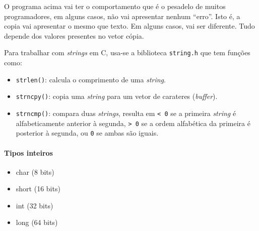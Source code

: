 \documentclass[
]{article}
\newenvironment{Shaded}{}{}
\newcommand{\CommentTok}[1]{\textcolor[rgb]{0.38,0.63,0.69}{\textit{#1}}}
\newcommand{\ControlFlowTok}[1]{\textcolor[rgb]{0.00,0.44,0.13}{\textbf{#1}}}
\newcommand{\DataTypeTok}[1]{\textcolor[rgb]{0.56,0.13,0.00}{#1}}
\newcommand{\DecValTok}[1]{\textcolor[rgb]{0.25,0.63,0.44}{#1}}
\newcommand{\ImportTok}[1]{#1}
\newcommand{\NormalTok}[1]{#1}
\newcommand{\PreprocessorTok}[1]{\textcolor[rgb]{0.74,0.48,0.00}{#1}}
\newcommand{\SpecialCharTok}[1]{\textcolor[rgb]{0.25,0.44,0.63}{#1}}
\newcommand{\StringTok}[1]{\textcolor[rgb]{0.25,0.44,0.63}{#1}}
\providecommand{\tightlist}{%
  \setlength{\itemsep}{0pt}\setlength{\parskip}{0pt}}
\begin{document}
\begin{Shaded}
\end{Shaded}

O programa acima vai ter o comportamento que é o pesadelo de muitos
programadores, em alguns casos, não vai apresentar nenhum ``erro''. Isto
é, a copia vai apresentar o mesmo que texto. Em alguns casos, vai ser
diferente. Tudo depende dos valores presentes no vetor cópia.

Para trabalhar com \emph{strings} em C, usa-se a biblioteca
\texttt{string.h} que tem funções como:

\begin{itemize}
\tightlist
\item
  \texttt{strlen()}: calcula o comprimento de uma \emph{string}.
\item
  \texttt{strncpy()}: copia uma \emph{string} para um vetor de carateres
  (\emph{buffer}).
\item
  \texttt{strncmp()}: compara duas \emph{strings}, resulta em
  \texttt{\textless{}\ 0} se a primeira \emph{string} é alfabeticamente
  anterior à segunda, \texttt{\textgreater{}\ 0} se a ordem alfabética
  da primeira é posterior à segunda, ou \texttt{0} se ambas são iguais.
\end{itemize}

\hypertarget{tipos-inteiros}{%
\paragraph{Tipos inteiros}\label{tipos-inteiros}}

\begin{itemize}
\tightlist
\item
  char (8 bits)
\item
  short (16 bits)
\item
  int (32 bits)
\item
  long (64 bits)
\end{itemize}
\end{document}
